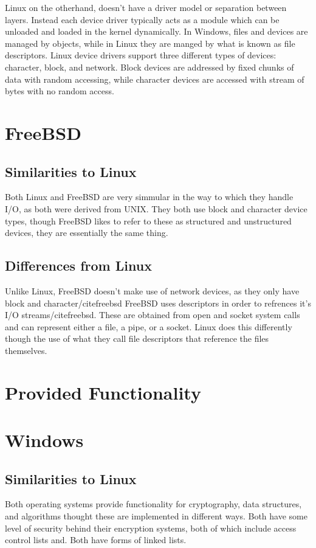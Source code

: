 \documentclass[letterpaper,10pt,draftclsnofoot,onecolumn, titlepage]{IEEEtran}
\begin{document}
Linux on the otherhand, doesn't have a driver model or separation between layers. Instead each device driver typically acts as a module which can be unloaded and loaded in the kernel dynamically. In Windows, files and devices are managed by objects, while in Linux they are manged by what is known as file descriptors. Linux device drivers support three different types of devices: character, block, and network. Block devices are addressed by fixed chunks of data with random accessing, while character devices are accessed with stream of bytes with no random access.

 
\section{FreeBSD}
\subsection{Similarities to Linux}
Both Linux and FreeBSD are very simmular in the way to which they handle I/O, as both were derived from UNIX. They both use block and character device types, though FreeBSD likes to refer to these as structured and unstructured devices, they are essentially the same thing\cite{freebsd}. 

\subsection{Differences from Linux}
Unlike Linux, FreeBSD doesn't make use of network devices, as they only have block and character/cite{freebsd} FreeBSD uses descriptors in order to refrences it's I/O streams/cite{freebsd}. These are obtained from open and socket system calls and can represent either a file, a pipe, or a socket. Linux does this differently though the use of what they call file descriptors that reference the files themselves.
\section{Provided Functionality}
\section{Windows}
\subsection{Similarities to Linux}
Both operating systems provide functionality for cryptography, data structures, and algorithms thought these are implemented in different ways. Both have some level of security behind their encryption systems, both of which include access control lists and. Both have forms of linked lists.
\end{document}
